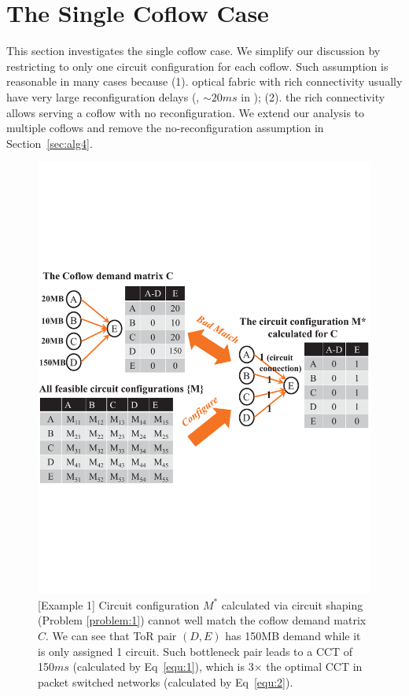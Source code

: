 
\section{The Single Coflow Case}
\label{sec:alg}
This section investigates the single coflow case.
We simplify our discussion by restricting to only one circuit configuration for each coflow. Such assumption is reasonable in many cases because  (1). optical fabric with rich connectivity usually have very large reconfiguration delays (\ie, $\sim$$20ms$ in \cite{megaswitch}); (2). the rich connectivity allows serving a coflow with no reconfiguration.
We extend our analysis to multiple coflows and remove the no-reconfiguration assumption in Section~\ref{sec:alg4}.

\begin{figure}[t]
  \centering
  \includegraphics[scale=0.38]{figures/X11}%
  \caption{[Example 1] Circuit configuration $M^*$ calculated via circuit shaping (Problem \ref{problem:1}) cannot well match the coflow demand matrix $C$. We can see that ToR pair $(D,E)$ has 150MB demand while it is only assigned 1 circuit. Such bottleneck pair leads to a CCT of 150$ms$ (calculated by Eq~\eqref{equ:1}), which is 3$\times$ the optimal CCT in packet switched networks (calculated by Eq~\eqref{equ:2}).}
  \label{fig:1}
\end{figure}

